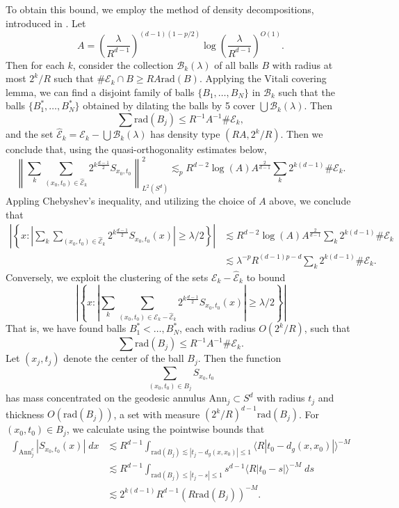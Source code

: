 \documentclass[dvipsnames,letterpaper,12pt]{article}
\begin{document}
To obtain this bound, we employ the method of density decompositions, introduced in \cite{HeoandNazarovandSeeger}. Let
%
\[ A = \left( \frac{\lambda}{R^{d-1}} \right)^{(d-1)(1 - p/2)} \log \left( \frac{\lambda}{R^{d-1}} \right)^{O(1)}. \]
%
Then for each $k$, consider the collection $\mathcal{B}_k(\lambda)$ of all balls $B$ with radius at most $2^k / R$ such that $\# \mathcal{E}_k \cap B \geq R A \text{rad}(B)$. Applying the Vitali covering lemma, we can find a disjoint family of balls $\{ B_1, \dots, B_N \}$ in $\mathcal{B}_k$ such that the balls $\{ B_1^*, \dots, B_N^* \}$ obtained by dilating the balls by 5 cover $\bigcup \mathcal{B}_k(\lambda)$. Then
%
\[ \sum \text{rad}(B_j) \leq R^{-1} A^{-1} \# \mathcal{E}_k, \]
%
and the set $\widehat{\mathcal{E}}_k = \mathcal{E}_k - \bigcup \mathcal{B}_k(\lambda)$ has density type $(R A, 2^k / R)$. Then we conclude that, using the quasi-orthogonality estimates below,
%
\[ \left\| \sum_k \sum_{(x_0,t_0) \in \widehat{\mathcal{E}}_k} 2^{k \frac{d-1}{2}} {S\!}_{x_0,t_0} \right\|_{L^2(S^d)}^2 \lesssim_p R^{d-2} \log(A) A^{\frac{2}{d-1}} \sum_k 2^{k(d-1)} \# \mathcal{E}_k. \]
%
Appling Chebyshev's inequality, and utilizing the choice of $A$ above, we conclude that
%
\begin{align*}
    \left| \left\{ x: \left|\sum_k \sum_{(x_0,t_0) \in \widehat{\mathcal{E}}_k} 2^{k \frac{d-1}{2}} {S\!}_{x_0,t_0}(x)\right| \geq \lambda / 2 \right\} \right| &\lesssim R^{d-2} \log(A) A^{\frac{2}{d-1}} \sum_k 2^{k(d-1)} \# \mathcal{E}_k\\
    &\lesssim \lambda^{-p} R^{(d-1)p - d} \sum_k 2^{k(d-1)} \# \mathcal{E}_k.
\end{align*}
% 
Conversely, we exploit the clustering of the sets $\mathcal{E}_k - \widehat{\mathcal{E}}_k$ to bound
%
\[ \left| \left\{ x: \left|\sum_k \sum_{(x_0,t_0) \in \mathcal{E}_k - \widehat{\mathcal{E}}_k} 2^{k \frac{d-1}{2}} {S\!}_{x_0,t_0}(x)\right| \geq \lambda / 2 \right\} \right| \]
%
That is, we have found balls $B_1^*< \dots, B_N^*$, each with radius $O(2^k / R)$, such that
%
\[ \sum \text{rad}(B_j) \leq R^{-1} A^{-1} \# \mathcal{E}_k. \]
%
Let $(x_j,t_j)$ denote the center of the ball $B_j$. Then the function
%
\[ \sum_{(x_0,t_0) \in B_j} {S\!}_{x_0,t_0} \]
%
has mass concentrated on the geodesic annulus $\text{Ann}_j \subset S^d$ with radius $t_j$ and thickness $O( \text{rad}(B_j) )$, a set with measure $(2^k / R)^{d-1} \text{rad}(B_j)$. For $(x_0,t_0) \in B_j$, we calculate using the pointwise bounds that
%
\begin{align*}
    \int_{\text{Ann}_j^c} |{S\!}_{x_0,t_0}(x)|\; dx &\lesssim R^{d-1} \int_{\text{rad}(B_j) \lesssim |t_j - d_g(x,x_0)| \leq 1} \langle R |t_0 - d_g(x,x_0)| \rangle^{-M}\\
    &\lesssim R^{d-1} \int_{\text{rad}(B_j) \leq |t_j - s| \leq 1} s^{d-1} \langle R |t_0 - s| \rangle^{-M}\; ds\\
    &\lesssim 2^{k(d-1)} R^{d-1} ( R \text{rad}(B_j) )^{-M}.
\end{align*}
\end{document}
